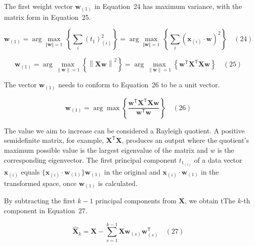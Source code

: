 \documentclass[preprint,12pt]{elsarticle}
\begin{document}
The first weight vector $\mathbf{w}_{\left(1\right)}$ in Equation~24 has maximum variance, with the matrix form in Equation~25.

\begin{equation}
	\mathbf{w}_{\left(1\right)}=\arg \max_{\Vert \mathbf{w} \Vert =1}\,\left\{\sum_{i}(t_{1})_{\left(i\right)}^{2}\right\}=\arg \max_{\Vert \mathbf{w} \Vert =1}\,\left\{\sum_{i}\left(\mathbf{x}_{\left(i\right)}\cdot \mathbf{w} \right)^{2}\right\}
	\quad\left(24\right)
\end{equation}

\begin{equation}
	\mathbf{w}_{\left(1\right)}=\arg \max_{\left\|\mathbf{w} \right\|=1}\left\{\left\|\mathbf{Xw} \right\|^{2}\right\}=\arg \max_{\left\|\mathbf{w} \right\|=1}\left\{\mathbf{w}^{\mathsf{T}}\mathbf{X}^{\mathsf{T}}\mathbf{Xw} \right\}
	\quad\left(25\right)
\end{equation}

The vector $\mathbf{w}_{\left(1\right)}$ needs to conform to Equation~26 to be a unit vector.

\begin{equation}
	\mathbf{w}_{\left(1\right)}=\arg \max \left\{{\frac{\mathbf{w}^{\mathsf{T}}\mathbf{X}^{\mathsf{T}}\mathbf{Xw}}{\mathbf{w}^{\mathsf{T}}\mathbf{w}}}\right\}
	\quad\left(26\right)
\end{equation}

The value we aim to increase can be considered a Rayleigh quotient. A positive semidefinite matrix, for example, $\mathbf{X}^{\mathsf{T}}\mathbf{X}$, produces an output where the quotient's maximum possible value is the largest eigenvalue of the matrix and $w$ is the corresponding eigenvector.
The first principal component  $t_{1_{\left(i\right)}}$ of a data vector $\mathbf{x}_{\left(i\right)}$ equals $\{\mathbf{x}_{\left(i\right)} \cdot \mathbf{w}_{\left(1\right)}\} \mathbf{w}_{\left(1\right)}$  in the original and $\mathbf{x}_{\left(i\right)} \cdot \mathbf{w}_{\left(1\right)}$ in the transformed space, once $\mathbf{w}_{\left(1\right)}$ is calculated.

By subtracting the first $k - 1$ principal components from $\mathbf{X}$, we obtain tThe $k$-th component in Equation~27.

\begin{equation}
	\mathbf{\hat{X}}_{k}=\mathbf{X} -\sum_{s=1}^{k-1}\mathbf{X} \mathbf{w}_{\left(s\right)}\mathbf{w}_{\left(s\right)}^{\mathsf{T}}
	\quad\left(27\right)
\end{equation}
\end{document}
